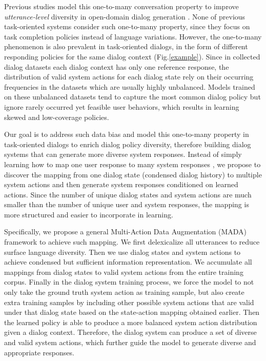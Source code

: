 \documentclass[letterpaper]{article} \usepackage{aaai20}  \usepackage{times}  \usepackage{helvet} \usepackage{courier}  \usepackage[hyphens]{url}  \usepackage{graphicx} \urlstyle{rm} \def\UrlFont{\rm}  \usepackage{graphicx}  \frenchspacing  \setlength{\pdfpagewidth}{8.5in}  \setlength{\pdfpageheight}{11in}  \usepackage{multirow}
\begin{document}
	
	Previous studies model this one-to-many conversation property to improve \textit{utterance-level} diversity in open-domain dialog generation \cite{zhao2017learning,zhou2017mechanism,zhou2018elastic}. 
	None of previous task-oriented systems consider such one-to-many property, since they focus on task completion policies instead of language variations. However, the one-to-many phenomenon is also prevalent in task-oriented dialogs, in the form of different responding policies for the same dialog context (Fig.\ref{example}).
Since in collected dialog datasets each dialog context has only one reference response, the distribution of valid system actions for each dialog state rely on their occurring frequencies in the datasets which are usually highly unbalanced.
	Models trained on these unbalanced datasets tend to capture the most common dialog policy but ignore rarely occurred yet feasible user behaviors, which results in learning skewed and low-coverage policies.
	
	Our goal is to address such data bias and model this one-to-many property in task-oriented dialogs to enrich dialog policy diversity, therefore building dialog systems that can generate more diverse system responses. Instead of simply learning how to map one user response to many system responses \cite{rajendran2018learning}
	, we propose to discover the mapping from one dialog state (condensed dialog history) to multiple system actions and then generate system responses conditioned on learned actions. Since the number of unique dialog states and system actions are much smaller than the number of unique user and system responses, the mapping is more structured and easier to incorporate in learning. 
	
	Specifically, we propose a general Multi-Action Data Augmentation (MADA) framework to achieve such mapping. 
	We first delexicalize all utterances to reduce surface language diversity. 
Then we use dialog states and system actions to achieve condensed but sufficient information representation.
We accumulate all mappings from dialog states to valid system actions from the entire training corpus.
	Finally in the dialog system training process, we force the model to not only take the ground truth system action as training sample, but also create extra training samples by including other possible system actions that are valid under that dialog state based on the state-action mapping obtained earlier. Then the learned policy is able to produce a more balanced system action distribution given a dialog context. Therefore, the dialog system can produce a set of diverse and valid system actions, which further guide the model to generate diverse and appropriate responses. 
	
\end{document}
